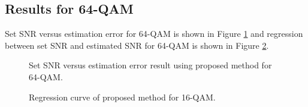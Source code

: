 \documentclass[12pt]{report}
\begin{document}
\subsection{Results for 64-QAM}
Set SNR versus estimation error for 64-QAM is shown in Figure \ref{fig:error_proposed_64qam} and regression between set SNR and estimated SNR for 64-QAM is shown in Figure \ref{fig:regression_proposed_64qam}. 

\begin{figure}[htbp]
	\caption{Set SNR versus estimation error result using proposed method for 64-QAM. }
	\label{fig:error_proposed_64qam}
\end{figure}
\begin{figure}[htbp]
	\caption{Regression curve of proposed method for 16-QAM. }
	\label{fig:regression_proposed_64qam}
\end{figure}
\end{document}
